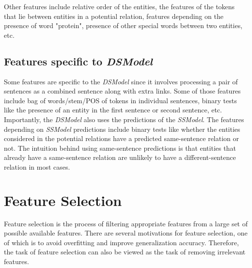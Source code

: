 Other features include relative order of the entities, the features of the tokens that lie between entities in a potential relation, features depending on the presence of word "protein", presence of other special words between two entities, etc. %

\subsection*{Features specific to \textit{DSModel}}

Some features are specific to the \textit{DSModel} since it involves processing a pair of sentences as a combined sentence along with extra links. Some of those features include bag of words/stem/POS of tokens in individual sentences, binary tests like the presence of an entity in the first sentence or second sentence, etc. Importantly, the \textit{DSModel} also uses the predictions of the \textit{SSModel}. The features depending on \textit{SSModel} predictions include binary tests like whether the entities considered in the potential relations have a predicted same-sentence relation or not. The intuition behind using same-sentence predictions is that entities that already have a same-sentence relation are unlikely to have a different-sentence relation in most cases.

\section{Feature Selection}\label{sec:featSel}

Feature selection is the process of filtering appropriate features from a large set of possible available features. There are several motivations for feature selection, one of which is to avoid overfitting and improve generalization accuracy. Therefore, the task of feature selection can also be viewed as the task of removing irrelevant features.

%
%
%

